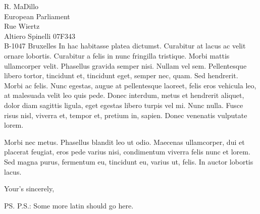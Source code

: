 \documentclass[a4paper,10pt]{letter}
\begin{document}
\begin{letter}{
    R. MaDillo\\
    European Parliament\\
    Rue Wiertz\\
    Altiero Spinelli 07F343\\
    B-1047 Bruxelles 
  }
  In hac habitasse platea dictumst. Curabitur at lacus ac velit ornare lobortis. 
  Curabitur a felis in nunc fringilla tristique. Morbi mattis ullamcorper velit. 
  Phasellus gravida semper nisi. Nullam vel sem. Pellentesque libero tortor, 
  tincidunt et, tincidunt eget, semper nec, quam. Sed hendrerit. Morbi ac felis. 
  Nunc egestas, augue at pellentesque laoreet, felis eros vehicula leo, at 
  malesuada velit leo quis pede. Donec interdum, metus et hendrerit aliquet, 
  dolor diam sagittis ligula, eget egestas libero turpis vel mi. Nunc nulla. 
  Fusce risus nisl, viverra et, tempor et, pretium in, sapien. Donec venenatis 
  vulputate lorem.

  Morbi nec metus. Phasellus blandit leo ut odio. Maecenas ullamcorper, dui et 
  placerat feugiat, eros pede varius nisi, condimentum viverra felis nunc et 
  lorem. Sed magna purus, fermentum eu, tincidunt eu, varius ut, felis. In 
  auctor lobortis lacus.  
%
  \closing{Your's sincerely,}
%
  \ps{P.S.: Some more latin should go here.}
\end{letter}
\end{document}
